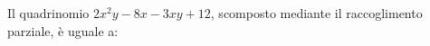 Il quadrinomio 
$\displaystyle 2x^2y - 8x - 3xy +12$, 
scomposto mediante il raccoglimento parziale, è uguale a:
